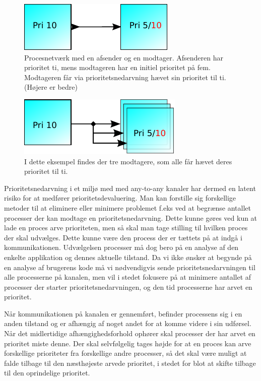 \begin{figure}
 \begin{center}
  \includegraphics[scale=1.00]{images/one-to-one-inheritance}
\caption{Procesnetværk med en afsender og en modtager. Afsenderen har prioritet ti, mens modtageren har en initiel prioritet på fem. Modtageren  får via prioritetsnedarvning hævet sin prioritet til ti. (Højere er bedre)}
  \label{fig:one-to-one-inheritance}
  \end{center}
\end{figure}

\begin{figure}
 \begin{center}
  \includegraphics[scale=1.00]{images/any-to-any-inheritance}
  \caption{I dette eksempel findes der tre modtagere, som alle får hævet deres prioritet til ti.}
  \label{fig:any-to-any-inheritance}
  \end{center}
\end{figure}

 Prioritetsnedarvning i et miljø med med any-to-any kanaler har dermed en latent risiko for at medfører prioritetsdevaluering. Man kan forstille sig forskellige metoder til at eliminere eller minimere problemet f.eks ved at begrænse antallet processer der kan modtage en prioritetsnedarvning. Dette kunne gøres ved kun at lade en proces arve prioriteten,  men så skal man tage stilling til hvilken proces der skal udvælges. Dette kunne være den process der er tættets på at indgå i kommunikationen.  Udvælgelsen processer må dog bero på en analyse af den enkelte applikation og dennes aktuelle tilstand. Da vi ikke ønsker at  begynde på en analyse af  brugerens kode må vi nødvendigvis sende prioritetsnedarvningen til alle processerne på kanalen, men vil i stedet fokusere på at minimere antallet af processer der starter prioritetsnedarvningen, og den tid processerne har arvet en prioritet.

Når kommunikationen på kanalen er gennemført, befinder processens sig i en anden tilstand og er afhængig af noget andet for at komme videre i sin udførsel. 
Når det midlertidige afhængighedsforhold ophører skal processer der har arvet en prioritet miste denne. Der skal selvfølgelig tages højde for at en proces kan arve forskellige prioriteter fra forskellige andre processer, så det skal være muligt at falde tilbage til den næsthøjeste arvede prioritet, i stedet for blot at skifte tilbage til den oprindelige prioritet. 

